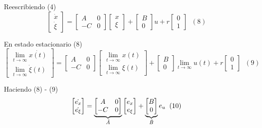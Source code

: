 Reescribiendo (4)
\[
    \begin{bmatrix}
        \dot{x} \\ \dot{\xi}
    \end{bmatrix} = 
    \begin{bmatrix}
        A & 0 \\
        -C & 0
    \end{bmatrix}
    \begin{bmatrix}
        x \\ \xi
    \end{bmatrix} +
    \begin{bmatrix}
        B \\ 0
    \end{bmatrix}u + r
    \begin{bmatrix}
        0 \\ 1
    \end{bmatrix} \;\; (8)  
\]

En estado estacionario (8)
\[
    \begin{bmatrix}
        \lim_{t \to \infty} \dot{x(t)} \\ 
        \lim_{t \to \infty} \dot{\xi} (t)
    \end{bmatrix} = 
    \begin{bmatrix}
        A & 0 \\
        -C & 0
    \end{bmatrix}
    \begin{bmatrix}
        \lim_{t \to \infty} x(t) \\
        \lim_{t \to \infty} \xi (t)
    \end{bmatrix} +
    \begin{bmatrix}
        B \\ 0
    \end{bmatrix} \lim_{t \to \infty} u(t) + r
    \begin{bmatrix}
        0 \\ 1
    \end{bmatrix} \;\; (9)
\]

Haciendo (8) - (9)
\[
    \begin{bmatrix}
        \dot{e_{x}} \\ 
        \dot{e_{\xi}}
    \end{bmatrix} = 
    \underbrace
    {
    \begin{bmatrix}
        A & 0 \\
        -C & 0
    \end{bmatrix}
    }_{\Tilde{A}}
    \begin{bmatrix}
        e_{x} \\
        e_{\xi}
    \end{bmatrix} +
    \underbrace
    {
    \begin{bmatrix}
        B \\ 0
    \end{bmatrix}
    }_{\tilde{B}}
    e_{u} \;\; (10)
\]

